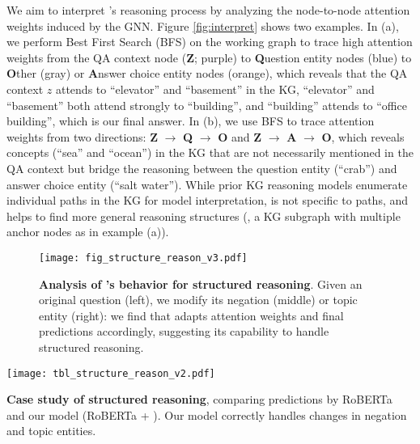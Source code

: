 We aim to interpret \methodname's reasoning process by analyzing the node-to-node attention weights induced by the GNN. 
Figure \ref{fig:interpret} shows two examples. In (a), we perform Best First Search (BFS) on the working graph to trace high attention weights from the QA context node (\textbf{Z}; purple) to \textbf{Q}uestion entity nodes (blue) to \textbf{O}ther (gray) or \textbf{A}nswer choice entity nodes (orange), which reveals that the QA context $z$ attends to ``elevator'' and ``basement'' in the KG, ``elevator'' and ``basement'' both attend strongly to ``building'', and ``building'' attends to ``office building'', which is our final answer. 
In (b), we use BFS to trace attention weights from two directions: 
\textbf{Z} $\!\rightarrow\!$ \textbf{Q} $\!\rightarrow\!$ \textbf{O} and \textbf{Z} $\!\rightarrow\!$ \textbf{A} $\!\rightarrow\!$ \textbf{O}, which reveals concepts (``sea'' and ``ocean'') in the KG that are not necessarily mentioned in the QA context but bridge the reasoning between the question entity (``crab'') and answer choice entity (``salt water'').
While prior KG reasoning models \cite{lin2019kagnet,feng2020scalable} enumerate individual paths in the KG for model interpretation, \methodname is not specific to paths, and helps to find more general reasoning structures (\eg, a KG subgraph with multiple anchor nodes as in example (a)).




\begin{figure*}[!th]
    \vspace{-5mm}
    \hspace{-1mm}
    \centering \texttt{[image: fig\_structure\_reason\_v3.pdf]}
\vspace{-1mm}
    \caption{\textbf{Analysis of \methodname's behavior for structured reasoning}. Given an original question (left), we modify its negation (middle) or topic entity (right): we find that \methodname adapts attention weights and final predictions accordingly, suggesting its capability to handle structured reasoning.
    }
    \vspace{-2mm}
\label{fig:structure_reason}
\end{figure*}

\begin{table*}[!th]
    \vspace{-0mm}
    \hspace{-1mm}
    \centering \texttt{[image: tbl\_structure\_reason\_v2.pdf]}
    \vspace{-2mm}
    \caption{\textbf{Case study of structured reasoning}, comparing predictions by RoBERTa and our model (RoBERTa + \methodname). Our model correctly handles changes in negation and topic entities.
    }
\label{tbl:structure_reason}
\end{table*}


